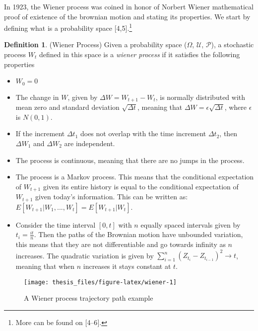 \documentclass[12pt,twoside]{reedthesis}
\theoremstyle{definition}
\newtheorem{definition}{Definition}[section]
\theoremstyle{definition}
\theoremstyle{remark}
\begin{document}
  In 1923, the Wiener process was coined in honor of Norbert Wiener
  mathematical proof of existence of the brownian motion and stating its
  properties. We start by defining what is a probability space
  {[}4,5{]}.\footnote{More can be found on {[}4--6{]}.}
  \begin{definition}{(Wiener Process)} Given a probability space ($\Omega$, $\mathcal {U}$, $\mathcal {P}$), a stochastic process $W_t$ defined in this space is a \textit{wiener process} if it satisfies the following properties
  \begin{itemize}
    \item  $W_{0}=0$
    
    \item The change in $W$, given by $\Delta W = W_{t+1}-W_{t}$, is normally distributed with mean zero and standard deviation $\sqrt{\Delta t}$, meaning that $\Delta W = \epsilon\sqrt{\Delta t}$, where $\epsilon$ is $N(0,1)$.
    
    \item If the increment $\Delta t_1$ does not overlap with the time increment $\Delta t_2$, then $\Delta W_1$ and $\Delta W_2$ are independent.
    
    \item The process is continuous, meaning that there are no jumps in the process.
    
    \item The process is a Markov process. This means that the conditional expectation of $W_{t+1}$ given its entire history is equal to the conditional expectation of $W_{t+1}$ given today's information. This can be written as: $E[W_{t+1}|W_1, ..., W_t] = E[W_{t+1}|W_t]$.
    
    \item Consider the time interval $[0,t]$ with $n$ equally spaced intervals given by $t_i = \frac{it}{n}$. Then the paths of the Brownian motion have unbounded variation, this means that they are not differentiable and go towards infinity as $n$ increases. The quadratic variation is given by $\sum_{i=1}^{n}{(Z_{t_i}-Z_{t_{i-1}})^2} \rightarrow t$, meaning that when $n$ increases it stays constant at $t$. 
  
  \end{itemize}
  \end{definition}
  \begin{figure}
  
  {\centering \texttt{[image: thesis\_files/figure-latex/wiener-1]} 
  
  }
  
  \caption{A Wiener process trajectory path example \label{wiener}}\label{fig:wiener}
  \end{figure}
\end{document}
